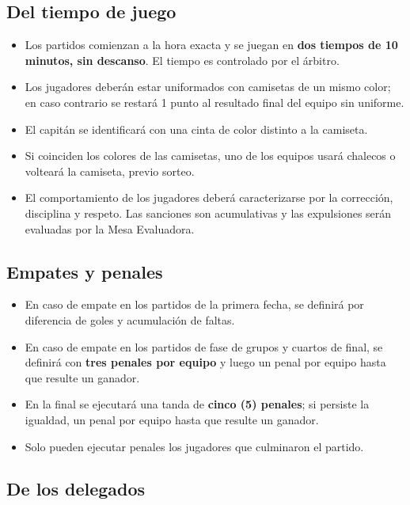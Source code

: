 	\subsection{Del tiempo de juego}

	\begin{itemize}
		\item Los partidos comienzan a la hora exacta y se juegan en \textbf{dos tiempos de 10 minutos, sin descanso}. El tiempo es controlado por el árbitro.
		\item Los jugadores deberán estar uniformados con camisetas de un mismo color; en caso contrario se restará 1 punto al resultado final del equipo sin uniforme.
		\item El capitán se identificará con una cinta de color distinto a la camiseta.
		\item Si coinciden los colores de las camisetas, uno de los equipos usará chalecos o volteará la camiseta, previo sorteo.
		\item El comportamiento de los jugadores deberá caracterizarse por la corrección, disciplina y respeto. Las sanciones son acumulativas y las expulsiones serán evaluadas por la Mesa Evaluadora.
	\end{itemize}

	\subsection{Empates y penales}

	\begin{itemize}
		\item En caso de empate en los partidos de la primera fecha, se definirá por diferencia de goles y acumulación de faltas.
		\item En caso de empate en los partidos de fase de grupos y cuartos de final, se definirá con \textbf{tres penales por equipo} y luego un penal por equipo hasta que resulte un ganador.
		\item En la final se ejecutará una tanda de \textbf{cinco (5) penales}; si persiste la igualdad, un penal por equipo hasta que resulte un ganador.
		\item Solo pueden ejecutar penales los jugadores que culminaron el partido.
	\end{itemize}

	\subsection{De los delegados}


